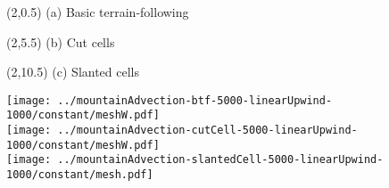 \documentclass{article}
\begin{document}
\TPMargin{2pt}
\begin{textblock}{4}(2,0.5)
\normalsize
(a) Basic terrain-following
\end{textblock}
\begin{textblock}{2}(2,5.5)
\normalsize
(b) Cut cells
\end{textblock}
\begin{textblock}{2.5}(2,10.5)
\normalsize
(c) Slanted cells
\end{textblock}
\centering
\texttt{[image: ../mountainAdvection-btf-5000-linearUpwind-1000/constant/meshW.pdf]} \\
\texttt{[image: ../mountainAdvection-cutCell-5000-linearUpwind-1000/constant/meshW.pdf]} \\
\hspace*{0.8em}\texttt{[image: ../mountainAdvection-slantedCell-5000-linearUpwind-1000/constant/mesh.pdf]}
\end{document}
